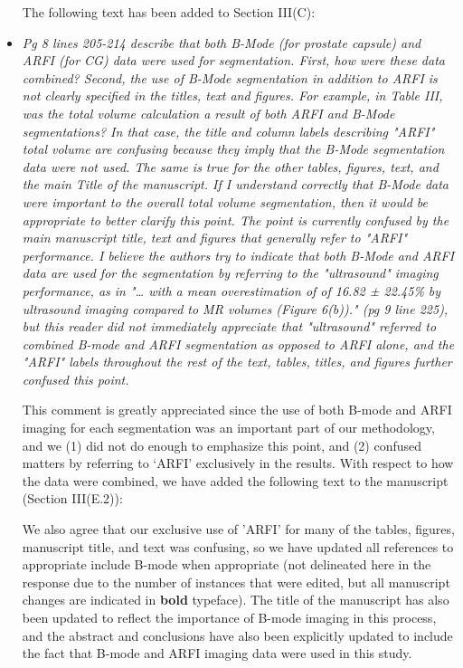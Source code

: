 \documentclass[10pt]{article}
\begin{document}
\begin{itemize}
    The following text has been added to Section III(C):

    

    \item \textit{Pg 8 lines 205-214 describe that both B-Mode (for prostate
            capsule) and ARFI (for CG) data were used for segmentation.  First,
            how were these data combined?  Second, the use of B-Mode
            segmentation in addition to ARFI is not clearly specified in the
            titles, text and figures.  For example, in Table III, was the total
            volume calculation a result of both ARFI and B-Mode segmentations?
            In that case, the title and column labels describing "ARFI" total
            volume are confusing because they imply that the B-Mode
            segmentation data were not used.  The same is true for the other
            tables, figures, text, and the main Title of the manuscript.  If I
            understand correctly that B-Mode data were important to the overall
            total volume segmentation, then it would be appropriate to better
            clarify this point.  The point is currently confused by the main
            manuscript title, text and figures that generally refer to "ARFI"
            performance.  I believe the authors try to indicate that both
            B-Mode and ARFI data are used for the segmentation by referring to
            the "ultrasound" imaging performance, as in "… with a mean
            overestimation of of 16.82 ± 22.45\% by ultrasound imaging compared
            to MR volumes (Figure 6(b))." (pg 9 line 225), but this reader did
            not immediately appreciate that "ultrasound" referred to combined
            B-mode and ARFI segmentation as opposed to ARFI alone, and the
            "ARFI" labels throughout the rest of the text, tables, titles, and
            figures further confused this point.}

    This comment is greatly appreciated since the use of both B-mode and ARFI
    imaging for each segmentation was an important part of our methodology, and
    we (1) did not do enough to emphasize this point, and (2) confused matters
    by referring to `ARFI' exclusively in the results.  With respect to how the
    data were combined, we have added the following text to the manuscript
    (Section III(E.2)):

    

    We also agree that our exclusive use of 'ARFI' for many of the tables,
    figures, manuscript title, and text was confusing, so we have updated all
    references to appropriate include B-mode when appropriate (not delineated
    here in the response due to the number of instances that were edited, but
    all manuscript changes are indicated in \textbf{bold} typeface).  The title
    of the manuscript has also been updated to reflect the importance of B-mode
    imaging in this process, and the abstract and conclusions have also been
    explicitly updated to include the fact that B-mode and ARFI imaging data
    were used in this study.


\end{itemize}
\end{document}
